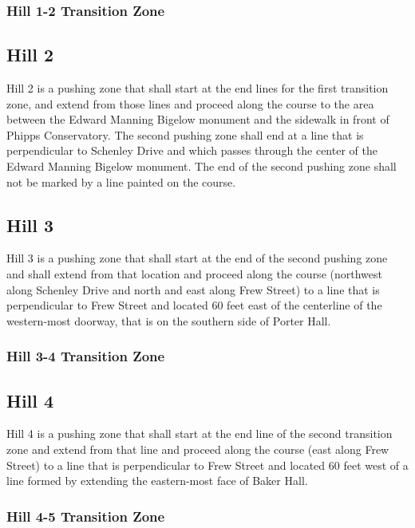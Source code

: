 \subsubsection{Hill 1-2 Transition Zone} 


\subsection{Hill 2}

	Hill 2 is a pushing zone that shall start at the end lines for the first transition 
	zone, and extend from those lines and proceed along the course to the area 
	between the Edward Manning Bigelow monument and the sidewalk in front of Phipps 
	Conservatory. The second pushing zone shall end at a line that is perpendicular to 
	Schenley Drive and which passes through the center of the Edward Manning Bigelow 
	monument. The end of the second pushing zone shall not be marked by a line painted 
	on the course.

\subsection{Hill 3}

	Hill 3 is a pushing zone that shall start at the end of the second pushing zone and 
	shall extend from that location and proceed along the course (northwest along Schenley 
	Drive and north and east along Frew	Street) to a line that is perpendicular to Frew 
	Street and located 60 feet east	of the centerline of the western-most doorway, that is 
	on the southern side of	Porter Hall.

\subsubsection{Hill 3-4 Transition Zone} 


\subsection{Hill 4}

	Hill 4 is a pushing zone that shall start at the end line of the second transition zone 
	and extend from that line and proceed along the course (east along Frew Street) to 
	a line that is perpendicular to	Frew Street and located 60 feet west of a line formed by 
	extending the eastern-most face of Baker Hall.

\subsubsection{Hill 4-5 Transition Zone} 

